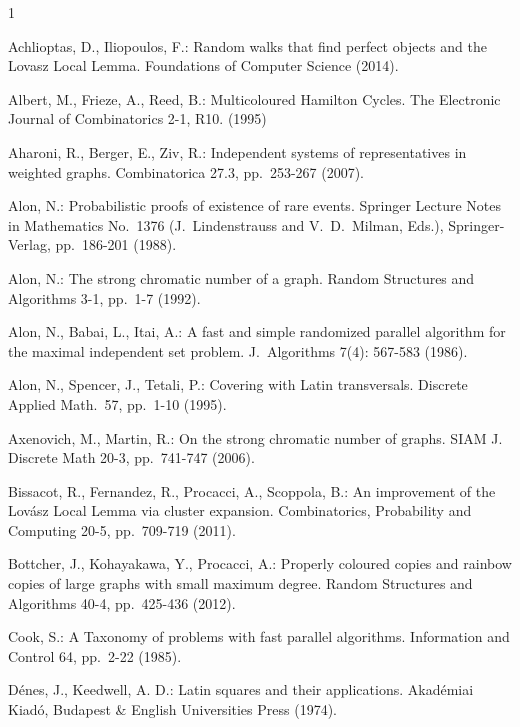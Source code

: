 

\begin{thebibliography}{1}

Achlioptas, D., Iliopoulos, F.: Random walks that find perfect objects and the Lovasz Local Lemma. Foundations of Computer Science (2014).

Albert, M., Frieze, A., Reed, B.: Multicoloured Hamilton Cycles. The Electronic Journal of Combinatorics 2-1, R10. (1995)

Aharoni, R., Berger, E., Ziv, R.: Independent systems of representatives in weighted graphs. Combinatorica 27.3, pp.\ 253-267 (2007).

Alon, N.: Probabilistic proofs of existence of rare events. Springer Lecture Notes in Mathematics No.\ 1376 (J.\ Lindenstrauss and V.\ D.\ Milman, Eds.), Springer-Verlag, pp.\ 186-201 (1988). 

Alon, N.: The strong chromatic number of a graph. Random Structures and Algorithms 3-1, pp.\ 1-7 (1992).

Alon, N., Babai, L., Itai, A.: A fast and simple randomized parallel algorithm for the maximal independent set problem. J.\ Algorithms 7(4): 567-583 (1986). 

Alon, N., Spencer, J., Tetali, P.: Covering with Latin transversals. Discrete Applied Math.\ 57, pp.\ 1-10 (1995). 

Axenovich, M., Martin, R.: On the strong chromatic number of graphs. SIAM J. Discrete Math 20-3, pp.\ 741-747 (2006).

Bissacot, R., Fernandez, R., Procacci, A., Scoppola, B.: An improvement of the Lov\'{a}sz Local Lemma via cluster expansion. Combinatorics, Probability and Computing 20-5, pp.\ 709-719 (2011).

Bottcher, J., Kohayakawa, Y., Procacci, A.: Properly coloured copies and rainbow copies of large graphs with small maximum degree. Random Structures and Algorithms 40-4, pp.\ 425-436 (2012).

Cook, S.: A Taxonomy of problems with fast parallel algorithms. Information and Control 64, pp.\ 2-22 (1985).

D\'{e}nes, J., Keedwell, A. D.: Latin squares and their applications. Akad\'{e}miai Kiad\'{o}, Budapest \&
English Universities Press (1974).


\end{thebibliography}
